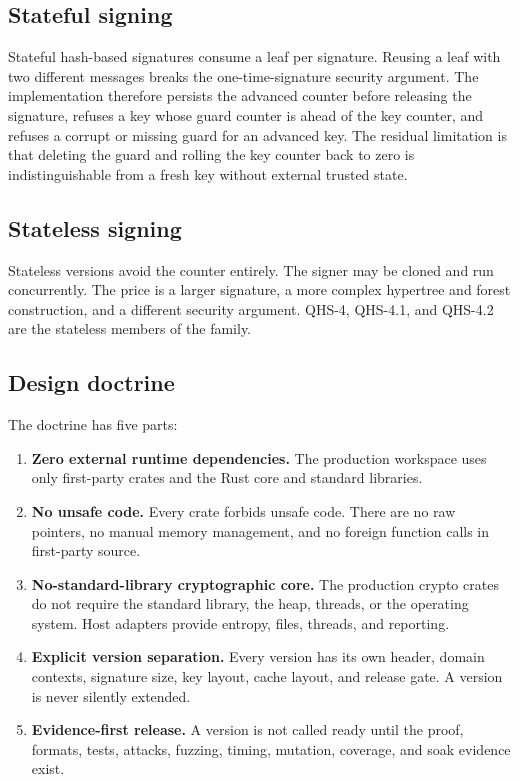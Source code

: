 \documentclass[11pt,a4paper]{article}
\begin{document}
\subsection{Stateful signing}

Stateful hash-based signatures consume a leaf per signature. Reusing a leaf
with two different messages breaks the one-time-signature security argument.
The implementation therefore persists the advanced counter before releasing
the signature, refuses a key whose guard counter is ahead of the key counter,
and refuses a corrupt or missing guard for an advanced key. The residual
limitation is that deleting the guard and rolling the key counter back to zero
is indistinguishable from a fresh key without external trusted state.

\subsection{Stateless signing}

Stateless versions avoid the counter entirely. The signer may be cloned and
run concurrently. The price is a larger signature, a more complex hypertree and
forest construction, and a different security argument. QHS-4, QHS-4.1, and
QHS-4.2 are the stateless members of the family.

\subsection{Design doctrine}

The doctrine has five parts:

\begin{enumerate}
  \item \textbf{Zero external runtime dependencies.} The production workspace
  uses only first-party crates and the Rust core and standard libraries.
  \item \textbf{No unsafe code.} Every crate forbids unsafe code. There are no
  raw pointers, no manual memory management, and no foreign function calls in
  first-party source.
  \item \textbf{No-standard-library cryptographic core.} The production crypto
  crates do not require the standard library, the heap, threads, or the
  operating system. Host adapters provide entropy, files, threads, and
  reporting.
  \item \textbf{Explicit version separation.} Every version has its own
  header, domain contexts, signature size, key layout, cache layout, and
  release gate. A version is never silently extended.
  \item \textbf{Evidence-first release.} A version is not called ready until the
  proof, formats, tests, attacks, fuzzing, timing, mutation, coverage, and soak
  evidence exist.
\end{enumerate}
\end{document}
